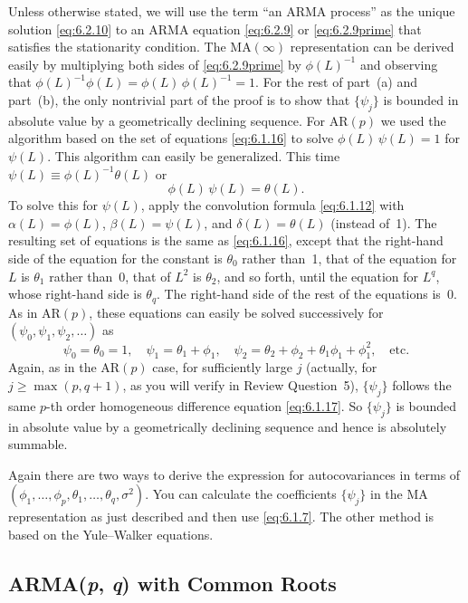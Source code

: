 Unless otherwise stated, we will use the term ``an ARMA process'' as the unique
solution \eqref{eq:6.2.10} to an ARMA equation \eqref{eq:6.2.9} or \eqref{eq:6.2.9prime} that satisfies the
stationarity condition. The $\text{MA}(\infty)$ representation can be derived easily by multiplying
both sides of \eqref{eq:6.2.9prime} by $\phi(L)^{-1}$ and observing that $\phi(L)^{-1} \phi(L) =
\phi(L)\,\phi(L)^{-1} = 1$. For the rest of part~(a) and part~(b), the only nontrivial part
of the proof is to show that $\{\psi_j\}$ is bounded in absolute value by a geometrically
declining sequence. For $\text{AR}(p)$ we used the algorithm based on the set of equations
\eqref{eq:6.1.16} to solve $\phi(L)\,\psi(L) = 1$ for $\psi(L)$. This algorithm can easily be
generalized. This time $\psi(L) \equiv \phi(L)^{-1} \theta(L)$ or
\[
  \phi(L)\,\psi(L) = \theta(L).
\]
To solve this for $\psi(L)$, apply the convolution formula \eqref{eq:6.1.12} with $\alpha(L) = \phi(L)$,
$\beta(L) = \psi(L)$, and $\delta(L) = \theta(L)$ (instead of~1). The resulting set of equations is
the same as \eqref{eq:6.1.16}, except that the right-hand side of the equation for the constant
is $\theta_0$ rather than~1, that of the equation for $L$ is $\theta_1$ rather than~0, that of $L^2$ is $\theta_2$, and
so forth, until the equation for $L^q$, whose right-hand side is $\theta_q$. The right-hand side
of the rest of the equations is~0. As in $\text{AR}(p)$, these equations can easily be solved
successively for $(\psi_0, \psi_1, \psi_2, \ldots)$ as
\[
  \psi_0 = \theta_0 = 1, \quad \psi_1 = \theta_1 + \phi_1, \quad
  \psi_2 = \theta_2 + \phi_2 + \theta_1 \phi_1 + \phi_1^2, \quad \text{etc.}
\]
Again, as in the $\text{AR}(p)$ case, for sufficiently large $j$ (actually, for $j \geq \max(p,
q+1)$, as you will verify in Review Question~5), $\{\psi_j\}$ follows the same $p$-th order
homogeneous difference equation \eqref{eq:6.1.17}. So $\{\psi_j\}$ is bounded in absolute value
by a geometrically declining sequence and hence is absolutely summable.

Again there are two ways to derive the expression for autocovariances in terms
of $(\phi_1, \ldots, \phi_p, \theta_1, \ldots, \theta_q, \sigma^2)$. You can calculate the coefficients $\{\psi_j\}$ in the MA
representation as just described and then use \eqref{eq:6.1.7}. The other method is based on
the Yule--Walker equations.

\subsection*{ARMA(\textit{p}, \textit{q}) with Common Roots}

